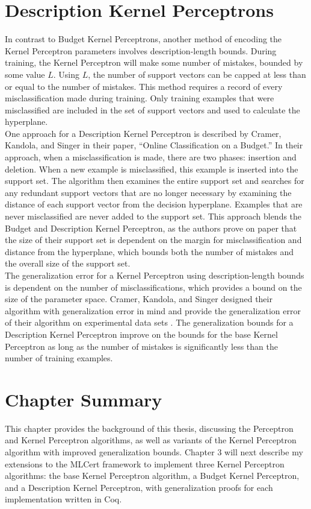 \section{Description Kernel Perceptrons}\label{DescriptionKernelPerceptronSection}
In contrast to Budget Kernel Perceptrons, another method of encoding the Kernel Perceptron parameters involves description-length bounds. During training, the Kernel Perceptron will make some number of mistakes, bounded by some value $L$. Using $L$, the number of support vectors can be capped at less than or equal to the number of mistakes. This method requires a record of every misclassification made during training. Only training examples that were misclassified are included in the set of support vectors and used to calculate the hyperplane.
\\One approach for a Description Kernel Perceptron is described by Cramer, Kandola, and Singer \cite{CKS03} in their paper, ``Online Classification on a Budget.'' In their approach, when a misclassification is made, there are two phases: insertion and deletion. When a new example is misclassified, this example is inserted into the support set. The algorithm then examines the entire support set and searches for any redundant support vectors that are no longer necessary by examining the distance of each support vector from the decision hyperplane. Examples that are never misclassified are never added to the support set. This approach blends the Budget and Description Kernel Perceptron, as the authors prove on paper that the size of their support set is dependent on the margin for misclassification and distance from the hyperplane, which bounds both the number of mistakes and the overall size of the support set. 
\\The generalization error for a Kernel Perceptron using description-length bounds is dependent on the number of misclassifications, which provides a bound on the size of the parameter space. Cramer, Kandola, and Singer designed their algorithm with generalization error in mind and provide the generalization error of their algorithm on experimental data sets \cite{CKS03}. The generalization bounds for a Description Kernel Perceptron improve on the bounds for the base Kernel Perceptron as long as the number of mistakes is significantly less than the number of training examples.
\section{Chapter Summary}\label{BackgroundChapterSummarySection}
This chapter provides the background of this thesis, discussing the Perceptron and Kernel Perceptron algorithms, as well as variants of the Kernel Perceptron algorithm with improved generalization bounds. Chapter 3 will next describe my extensions to the MLCert framework to implement three Kernel Perceptron algorithms: the base Kernel Perceptron algorithm, a Budget Kernel Perceptron, and a Description Kernel Perceptron, with generalization proofs for each implementation written in Coq.
